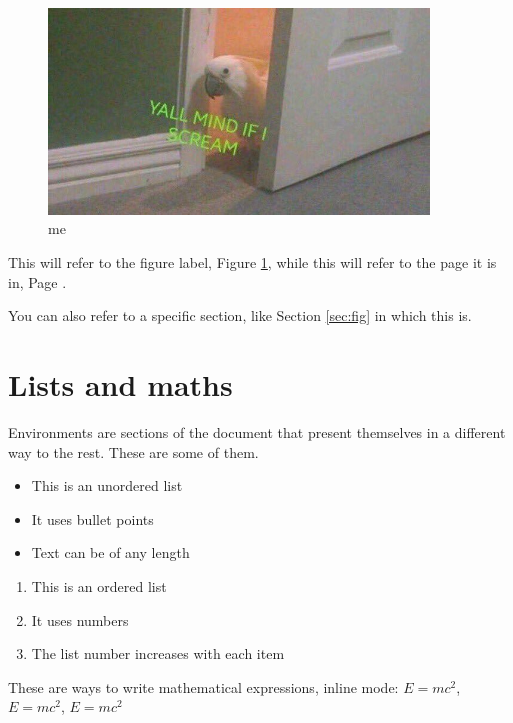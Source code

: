 \documentclass[12pt, letterpaper]{article} %
\begin{document}
\begin{figure}[h] %
    \centering %
    \includegraphics[width=0.9\textwidth]{scream.jpg} %
    \caption{me} %
    \label{fig:scream} %
\end{figure}

This will refer to the figure label, Figure \ref{fig:scream}, while this will refer to the page it is in, Page \pageref{fig:scream}.

You can also refer to a specific section, like Section \ref{sec:fig} in which this is.

\clearpage
\section{Lists and maths}
Environments are sections of the document that present themselves in a different way to the rest. These are some of them.

\begin{itemize}
  \item This is an unordered list
  \item It uses bullet points
  \item Text can be of any length
\end{itemize}

\begin{enumerate}
  \item This is an ordered list
  \item It uses numbers
  \item The list number increases with each item
\end{enumerate}

These are ways to write mathematical expressions, inline mode:
$E=mc^2$, 
\(E=mc^2\), 
\begin{math} E=mc^2 \end{math}
\end{document}
